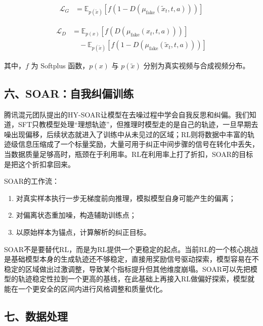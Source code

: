 \[
\begin{aligned}
\mathcal{L}_G
&=
\mathbb{E}_{p(\tilde{x})}
\left[
f\left(1-D(\mu_{\mathrm{fake}}(\tilde{x}_t,t,a))\right)
\right]
\end{aligned}
\]

\[
\begin{aligned}
\mathcal{L}_D
&=
\mathbb{E}_{p(x)}
\left[
f\left(D(\mu_{\mathrm{fake}}(x_t,t,a))\right)
\right]
\\
&\quad -
\mathbb{E}_{p(\tilde{x})}
\left[
f\left(1-D(\mu_{\mathrm{fake}}(\tilde{x}_t,t,a))\right)
\right]
\end{aligned}
\]

其中，\(f\) 为 Softplus 函数，\(p(x)\) 与 \(p(\tilde{x})\) 分别为真实视频与合成视频分布。

\hypertarget{ux516dsoarux81eaux6211ux7ea0ux504fux8badux7ec3}{%
\subsection{六、SOAR：自我纠偏训练}\label{ux516dsoarux81eaux6211ux7ea0ux504fux8badux7ec3}}

腾讯混元团队提出的HY-SOAR让模型在去噪过程中学会自我反思和纠偏。我们知道，SFT只教模型处理``理想轨迹''，但推理时模型走的是自己的轨迹，一旦早期去噪出现偏移，后续状态就进入了训练中从未见过的区域；RL则将数据中丰富的轨迹级信息压缩成了一个标量奖励，大量可用于纠正中间步骤的信号在转化中丢失，当数据质量足够高时，瓶颈在于利用率。RL在利用率上打了折扣，SOAR的目标是把这个折扣拿回来。

SOAR的工作流：

\begin{enumerate}
\def\labelenumi{\arabic{enumi}.}
\item
  对真实样本执行一步无梯度前向推理，模拟模型自身可能产生的偏离；
\item
  对偏离状态重加噪，构造辅助训练点；
\item
  以原始样本为锚点，计算解析的纠正目标。
\end{enumerate}

SOAR不是要替代RL，而是为RL提供一个更稳定的起点。当前RL的一个核心挑战是基础模型本身的生成轨迹还不够稳定，直接用奖励信号驱动探索，模型容易在不稳定的区域做出过激调整，导致某个指标提升但其他维度崩塌。SOAR可以先把模型的轨迹稳定性拉到一个更高的基线，在此基础上再接入RL做偏好探索，模型就能在一个更安全的区间内进行风格调整和质量优化。

\hypertarget{ux4e03ux6570ux636eux5904ux7406}{%
\subsection{七、数据处理}\label{ux4e03ux6570ux636eux5904ux7406}}

